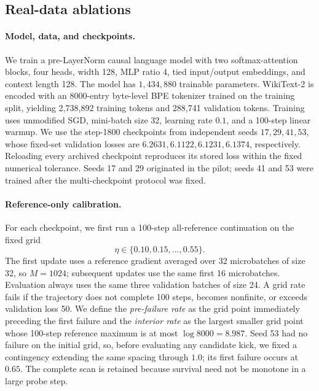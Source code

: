 \documentclass[11pt]{article}
\begin{document}
\subsection{Real-data ablations}
\label{app:trained-transformer-kick}

\paragraph{Model, data, and checkpoints.}
We train a pre-LayerNorm causal language model with two softmax-attention
blocks, four heads, width 128, MLP ratio 4, tied input/output embeddings, and
context length 128.  The model has \(1{,}434{,}880\) trainable parameters.
WikiText-2 is encoded with an 8000-entry byte-level BPE tokenizer trained on
the training split, yielding 2,738,892 training tokens and 288,741 validation
tokens.  Training uses unmodified SGD, mini-batch size 32, learning rate
\(0.1\), and a 100-step linear warmup.  We use the step-1800 checkpoints from
independent seeds \(17,29,41,53\), whose fixed-set validation losses are
\(6.2631,6.1122,6.1231,6.1374\), respectively.  Reloading every archived
checkpoint reproduces its stored loss within the fixed numerical tolerance.
Seeds 17 and 29 originated in the pilot; seeds 41 and 53 were trained after
the multi-checkpoint protocol was fixed.

\paragraph{Reference-only calibration.}
For each checkpoint, we first run a 100-step all-reference continuation on
the fixed grid
\[
  \eta\in\{0.10,0.15,\ldots,0.55\}.
\]
The first update uses a reference gradient averaged over 32 microbatches of
size 32, so \(M=1024\); subsequent updates use the same first 16
microbatches.  Evaluation always uses the same three validation batches of
size 24.  A grid rate fails if the trajectory does not complete 100 steps,
becomes nonfinite, or exceeds validation loss 50.  We define the
\emph{pre-failure rate} as the grid point immediately preceding the first
failure and the \emph{interior rate} as the largest smaller grid point whose
100-step reference maximum is at most \(\log8000=8.987\).  Seed 53 had no
failure on the initial grid, so, before evaluating any candidate kick, we
fixed a contingency extending the same spacing through \(1.0\); its first
failure occurs at \(0.65\).  The complete scan is retained because survival
need not be monotone in a large probe step.
\end{document}

